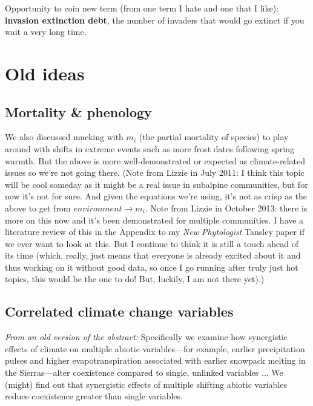 \documentclass[11pt,a4paper,oneside]{article}
\begin{document}
\noindent Opportunity to coin new term (from one term I hate and one that I like): {\bf invasion extinction debt}, the number of invaders that would go extinct if you wait a very long time. 

\newpage
\section{Old ideas}

\subsection{Mortality \& phenology}

\noindent We also discussed mucking with \(m_{i}\) (the partial
mortality of species) to play around with
shifts in extreme events such as more frost dates following spring
warmth. But the above is more well-demonstrated or expected as
climate-related issues so we're not going there. (Note from Lizzie in
July 2011: I think this topic will be cool someday as it might be a
real issue in subalpine communities, but for now it's not for
sure. And given the equations we're using, it's not as crisp as the
above to get from \(environment\rightarrow m_{i}\). Note from Lizzie in October 2013: there is more on this now and it's been demonstrated for multiple communities. I have a literature review of this in the Appendix to my \emph{New Phytologist} Tansley paper if we ever want to look at this. But I continue to think it is still a touch ahead of its time (which, really, just means that everyone is already excited about it and thus working on it without good data, so once I go running after truly just hot topics, this would be the one to do! But, luckily, I am not there yet).)\\ 

\subsection{Correlated climate change variables}
\noindent \emph{From an old version of the abstract:} Specifically we examine how
synergistic effects of climate on multiple abiotic variables---for
example, earlier precipitation pulses and higher evapotranspiration
associated with earlier snowpack melting in the Sierras---alter
coexistence compared to single, unlinked variables ... We
  (might) find out that synergistic effects of multiple shifting
  abiotic variables reduce coexistence greater than single
  variables. \\
\end{document}
